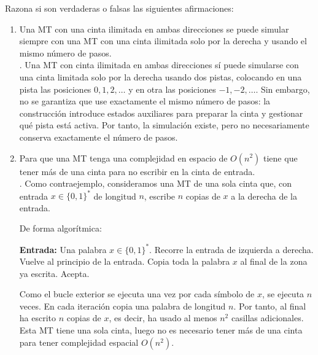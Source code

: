 \documentclass[12pt]{article}
\begin{document}
    \begin{ejercicio}[2.4 puntos]
        Razona si son verdaderas o falsas las siguientes afirmaciones:
        \begin{enumerate}
            \item Una MT con una cinta ilimitada en ambas direcciones se puede simular siempre con una MT con una cinta ilimitada solo por la derecha y 
            usando el mismo número de pasos. \\

            . Una MT con cinta ilimitada en ambas direcciones sí puede simularse con una cinta limitada solo por la derecha usando dos pistas, 
            colocando en una pista las posiciones $0,1,2,\dots$ y en otra las posiciones $-1,-2,\dots$. Sin embargo, no se garantiza que use exactamente el mismo 
            número de pasos: la construcción introduce estados auxiliares para preparar la cinta y gestionar qué pista está activa. Por tanto, la simulación existe, 
            pero no necesariamente conserva exactamente el número de pasos.

            \item Para que una MT tenga una complejidad en espacio de $O(n^2)$ tiene que tener más de una cinta para no escribir en la cinta de entrada. \\
            
            . Como contraejemplo, consideramos una MT de una sola cinta que, con entrada
            $x\in\{0,1\}^*$ de longitud $n$, escribe $n$ copias de $x$ a la derecha de la entrada.

            De forma algorítmica:

            \begin{algorithm}
            \caption{MT de una cinta que usa espacio $O(n^2)$}
            \begin{algorithmic}
            \State \textbf{Entrada:} Una palabra $x\in\{0,1\}^*$.
            \State Recorre la entrada de izquierda a derecha.
                \State Vuelve al principio de la entrada.
                \State Copia toda la palabra $x$ al final de la zona ya escrita.
            \EndFor
            \State Acepta.
            \end{algorithmic}
            \end{algorithm}

            Como el bucle exterior se ejecuta una vez por cada símbolo de $x$, se ejecuta $n$ veces.
            En cada iteración copia una palabra de longitud $n$. Por tanto, al final ha escrito $n$
            copias de $x$, es decir, ha usado al menos $n^2$ casillas adicionales. Esta MT tiene una sola cinta,
            luego no es necesario tener más de una cinta para tener complejidad espacial $O(n^2)$.


\end{enumerate}
\end{ejercicio}
\end{document}
